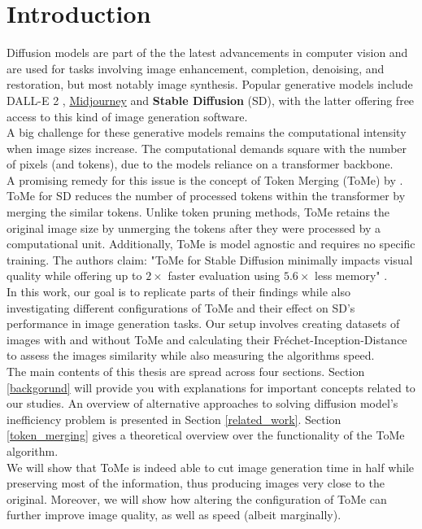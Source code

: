 \section{Introduction}
Diffusion models are part of the the latest advancements in computer vision and are used for tasks involving image enhancement, completion, denoising, and restoration, but most notably image synthesis. Popular generative models include DALL-E 2 \cite{ramesh2022hierarchical}, \href{https://www.midjourney.com}{Midjourney} and \textbf{Stable Diffusion} (SD), with the latter offering free access to this kind of image generation software.\\
A big challenge for these generative models remains the computational intensity when image sizes increase. The computational demands square with the number of pixels (and tokens), due to the models reliance on a transformer backbone.\\
A promising remedy for this issue is the concept of Token Merging (ToMe) by \cite{bolya2023tomesd}. ToMe for SD reduces the number of processed tokens within the transformer by merging the similar tokens. Unlike token pruning methods, ToMe retains the original image size by unmerging the tokens after they were processed by a computational unit. Additionally, ToMe is model agnostic and requires no specific training. The authors claim: "ToMe for Stable Diffusion minimally impacts visual quality while offering up to $2 \times$ faster evaluation using $5.6 \times$ less memory" \cite{bolya2023tomesd}.\\
In this work, our goal is to replicate parts of their findings while also investigating different configurations of ToMe and their effect on SD's performance in image generation tasks. Our setup involves creating datasets of images with and without ToMe and calculating their Fréchet-Inception-Distance to assess the images similarity while also measuring the algorithms speed.\\
The main contents of this thesis are spread across four sections. Section \ref{backgorund} will provide you with explanations for important concepts related to our studies. An overview of alternative approaches to solving diffusion model's inefficiency problem is presented in Section \ref{related_work}. Section \ref{token_merging} gives a theoretical overview over the functionality of the ToMe algorithm.
\\
We will show that ToMe is indeed able to cut image generation time in half while preserving most of the information, thus producing images very close to the original. Moreover, we will show how altering the configuration of ToMe can further improve image quality, as well as speed (albeit marginally).
\\


